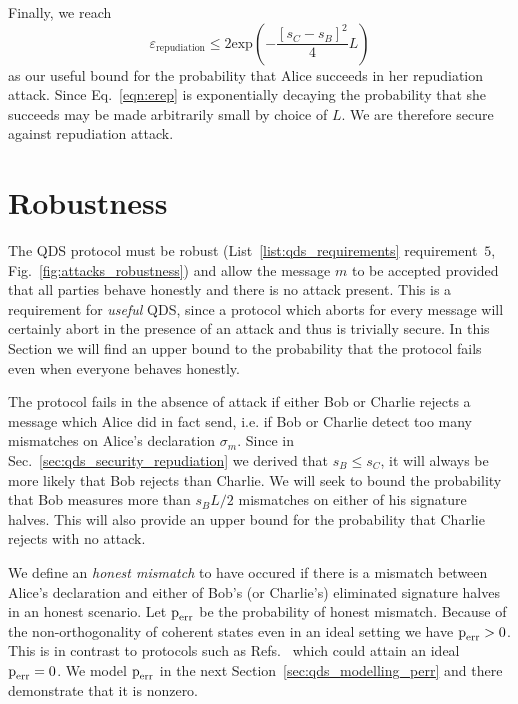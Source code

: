 \noindent Finally, we reach
\begin{equation}\label{eqn:erep}
\varepsilon_{\text{repudiation}} \le 2 \text{exp}\left( - \frac{\left[s_C - s_B\right]^2}{4} L\right)
\end{equation}
as our useful bound for the probability that Alice succeeds in her repudiation attack. Since Eq.~\ref{eqn:erep} is exponentially decaying the probability that she succeeds may be made arbitrarily small by choice of $L$. We are therefore secure against repudiation attack.




\section{Robustness}\label{sec:qds_security_robustness}
The QDS protocol must be robust (List~\ref{list:qds_requirements} requirement~$5$, Fig.~\ref{fig:attacks_robustness}) and allow the message $m$ to be accepted provided that all parties behave honestly and there is no attack present. This is a requirement for \emph{useful} QDS, since a protocol which aborts for every message will certainly abort in the presence of an attack and thus is trivially secure. In this Section we will find an upper bound to the probability that the protocol fails even when everyone behaves honestly.

The protocol fails in the absence of attack if either Bob or Charlie rejects a message which Alice did in fact send, i.e. if Bob or Charlie detect too many mismatches on Alice's declaration $\sigma_m$. Since in Sec.~\ref{sec:qds_security_repudiation} we derived that $s_B \le s_C$, it will always be more likely that Bob rejects than Charlie. We will seek to bound the probability that Bob measures more than $s_B L/2$ mismatches on either of his signature halves. This will also provide an upper bound for the probability that Charlie rejects with no attack.

We define an \emph{honest mismatch} to have occured if there is a mismatch between Alice's declaration and either of Bob's (or Charlie's) eliminated signature halves in an honest scenario. Let $\text{p}_{\text{err}}$ be the probability of honest mismatch. Because of the non-orthogonality of coherent states even in an ideal setting we have $\text{p}_{\text{err}} > 0$. This is in contrast to protocols such as Refs.~\cite{Donaldson2016, Collins2014} which could attain an ideal $\text{p}_{\text{err}} = 0$. We model $\text{p}_{\text{err}}$ in the next Section~\ref{sec:qds_modelling_perr} and there demonstrate that it is nonzero.

